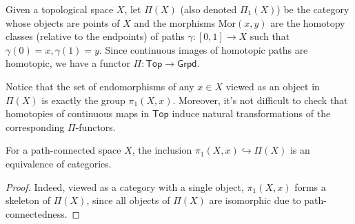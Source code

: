 \begin{defn}
    Given a topological space $X$, let $\Pi(X)$ (also denoted $\Pi_1(X)$) be the category whose objects are points of $X$ and the morphisms $\mathrm{Mor}(x,y)$ are the homotopy classes (relative to the endpoints) of paths $\gamma:[0,1]\to X$ such that $\gamma(0)=x, \gamma(1)=y$. Since continuous images of homotopic paths are homotopic, we have a functor $\Pi:\mathsf{Top}\to \mathsf{Grpd}$.
\end{defn}
Notice that the set of endomorphisms of any $x\in X$ viewed as an object in $\Pi(X)$ is exactly the group $\pi_1(X,x)$. Moreover, it's not difficult to check that homotopies of continuous maps in $\mathsf{Top}$ induce natural transformations of the corresponding $\Pi$-functors.
\begin{prop}
    For a path-connected space $X$, the inclusion $\pi_1(X,x)\hookrightarrow \Pi(X)$ is an equivalence of categories.
\end{prop}
\begin{proof}
    Indeed, viewed as a category with a single object, $\pi_1(X,x)$ forms a skeleton of $\Pi(X)$, since all objects of $\Pi(X)$ are isomorphic due to path-connectedness.
\end{proof}

